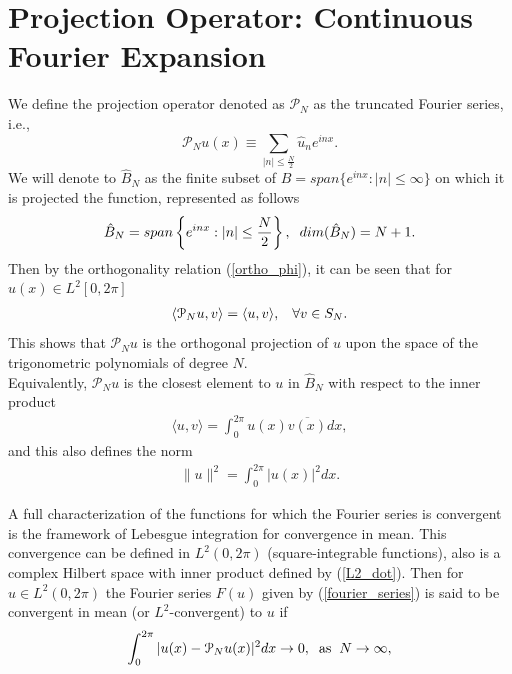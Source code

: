 \section{Projection Operator: Continuous Fourier Expansion}
	\vspace{0.2cm}
		
	We define the projection operator denoted as $\mathcal{P}_N$ as the truncated Fourier series, i.e.,
	\begin{equation}
	\label{proyection_operator}
		\mathcal{P}_N u(x) \equiv  \displaystyle \sum_{ |n| \leq \frac {N}{2}} \hat{u}_{n} e^{inx}.
	\end{equation}	
	We will denote to $\hat{B}_N$ as the finite subset of $B = span\{e^{inx}: |n| \leq \infty \}$ on which it is projected the function, represented as follows
	\begin{align*}
		\hat{B}_{N} = span \left\{e^{inx}: |n| \leq \frac {N}{2} \right\},\hspace{0.2cm} dim(\hat{B}_{N}) = N + 1.
	\end{align*}
	Then by the orthogonality relation (\ref{ortho_phi}), it can be seen that for $u(x) \in L^2 [0, 2\pi]$
	\begin{align*}
		\langle \mathcal{P}_N u, v \rangle = \langle u, v \rangle, \hspace{3mm} \forall v \in S_N.
	\end{align*}
	This shows that $\mathcal{P}_N u$ is the orthogonal projection of $u$ upon the space of the trigonometric polynomials of degree $N$.\\
	
	Equivalently, $\mathcal{P}_N u$ is the closest element to $u$ in $\hat{B}_N$ with respect to the inner product
	\begin{align*}
		\langle u, v \rangle = \displaystyle \int_{0}^{2 \pi} u(x) \overline{v(x)} dx,
	\end{align*}
	and this also defines the norm
	\begin{align}
	\label{L2_dot}
		\| u \|^2 = \displaystyle \int_{0}^{2 \pi} |u(x)|^2 dx.
	\end{align}
	
	A full characterization of the functions for which the Fourier series is convergent is the framework of Lebesgue integration for convergence in mean. This convergence can be defined in $L^2 (0, 2 \pi)$ (square-integrable functions), also is a complex Hilbert space with inner product defined by (\ref{L2_dot}). Then for $u \in L^2 (0, 2 \pi)$ the Fourier series $F(u)$ given by (\ref{fourier_series}) is said to be convergent in mean (or $L^2$-convergent) to $u$ if
	\begin{align}
		\label{L2_mean}
		\displaystyle \int_{0}^{2 \pi} |u(x) - \mathcal{P}_N u(x) |^2 dx \rightarrow 0, \hspace{2mm} \text{as} \hspace{2mm} N \rightarrow \infty,
	\end{align}
	
